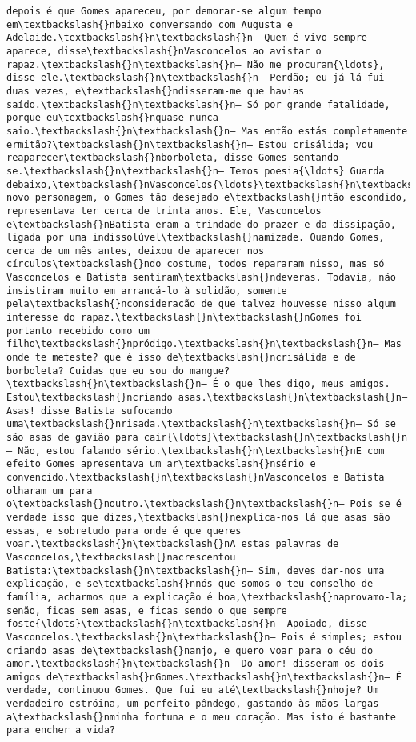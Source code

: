 \documentclass[11pt]{article}
\begin{document}
\begin{Verbatim}[commandchars=\\\{\}]
depois é que Gomes apareceu, por demorar-se algum tempo em\textbackslash{}nbaixo conversando com Augusta e Adelaide.\textbackslash{}n\textbackslash{}n— Quem é vivo sempre aparece, disse\textbackslash{}nVasconcelos ao avistar o rapaz.\textbackslash{}n\textbackslash{}n— Não me procuram{\ldots}, disse ele.\textbackslash{}n\textbackslash{}n— Perdão; eu já lá fui duas vezes, e\textbackslash{}ndisseram-me que havias saído.\textbackslash{}n\textbackslash{}n— Só por grande fatalidade, porque eu\textbackslash{}nquase nunca saio.\textbackslash{}n\textbackslash{}n— Mas então estás completamente ermitão?\textbackslash{}n\textbackslash{}n— Estou crisálida; vou reaparecer\textbackslash{}nborboleta, disse Gomes sentando-se.\textbackslash{}n\textbackslash{}n— Temos poesia{\ldots} Guarda debaixo,\textbackslash{}nVasconcelos{\ldots}\textbackslash{}n\textbackslash{}nO novo personagem, o Gomes tão desejado e\textbackslash{}ntão escondido, representava ter cerca de trinta anos. Ele, Vasconcelos e\textbackslash{}nBatista eram a trindade do prazer e da dissipação, ligada por uma indissolúvel\textbackslash{}namizade. Quando Gomes, cerca de um mês antes, deixou de aparecer nos círculos\textbackslash{}ndo costume, todos repararam nisso, mas só Vasconcelos e Batista sentiram\textbackslash{}ndeveras. Todavia, não insistiram muito em arrancá-lo à solidão, somente pela\textbackslash{}nconsideração de que talvez houvesse nisso algum interesse do rapaz.\textbackslash{}n\textbackslash{}nGomes foi portanto recebido como um filho\textbackslash{}npródigo.\textbackslash{}n\textbackslash{}n— Mas onde te meteste? que é isso de\textbackslash{}ncrisálida e de borboleta? Cuidas que eu sou do mangue?\textbackslash{}n\textbackslash{}n— É o que lhes digo, meus amigos. Estou\textbackslash{}ncriando asas.\textbackslash{}n\textbackslash{}n— Asas! disse Batista sufocando uma\textbackslash{}nrisada.\textbackslash{}n\textbackslash{}n— Só se são asas de gavião para cair{\ldots}\textbackslash{}n\textbackslash{}n— Não, estou falando sério.\textbackslash{}n\textbackslash{}nE com efeito Gomes apresentava um ar\textbackslash{}nsério e convencido.\textbackslash{}n\textbackslash{}nVasconcelos e Batista olharam um para o\textbackslash{}noutro.\textbackslash{}n\textbackslash{}n— Pois se é verdade isso que dizes,\textbackslash{}nexplica-nos lá que asas são essas, e sobretudo para onde é que queres voar.\textbackslash{}n\textbackslash{}nA estas palavras de Vasconcelos,\textbackslash{}nacrescentou Batista:\textbackslash{}n\textbackslash{}n— Sim, deves dar-nos uma explicação, e se\textbackslash{}nnós que somos o teu conselho de família, acharmos que a explicação é boa,\textbackslash{}naprovamo-la; senão, ficas sem asas, e ficas sendo o que sempre foste{\ldots}\textbackslash{}n\textbackslash{}n— Apoiado, disse Vasconcelos.\textbackslash{}n\textbackslash{}n— Pois é simples; estou criando asas de\textbackslash{}nanjo, e quero voar para o céu do amor.\textbackslash{}n\textbackslash{}n— Do amor! disseram os dois amigos de\textbackslash{}nGomes.\textbackslash{}n\textbackslash{}n— É verdade, continuou Gomes. Que fui eu até\textbackslash{}nhoje? Um verdadeiro estróina, um perfeito pândego, gastando às mãos largas a\textbackslash{}nminha fortuna e o meu coração. Mas isto é bastante para encher a vida? 
\end{Verbatim}
\end{document}
